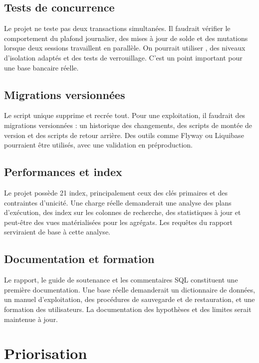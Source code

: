 \subsection{Tests de concurrence}

Le projet ne teste pas deux transactions simultanées. Il faudrait vérifier le
comportement du plafond journalier, des mises à jour de solde et des mutations
lorsque deux sessions travaillent en parallèle. On pourrait utiliser
, des niveaux d'isolation adaptés et des tests de verrouillage.
C'est un point important pour une base bancaire réelle.

\subsection{Migrations versionnées}

Le script unique supprime et recrée tout. Pour une exploitation, il faudrait
des migrations versionnées : un historique des changements, des scripts de
montée de version et des scripts de retour arrière. Des outils comme Flyway ou
Liquibase pourraient être utilisés, avec une validation en préproduction.

\subsection{Performances et index}

Le projet possède 21 index, principalement ceux des clés primaires et des
contraintes d'unicité. Une charge réelle demanderait une analyse des plans
d'exécution, des index sur les colonnes de recherche, des statistiques à jour
et peut-être des vues matérialisées pour les agrégats. Les requêtes du rapport
serviraient de base à cette analyse.

\subsection{Documentation et formation}

Le rapport, le guide de soutenance et les commentaires SQL constituent une
première documentation. Une base réelle demanderait un dictionnaire de données,
un manuel d'exploitation, des procédures de sauvegarde et de restauration, et
une formation des utilisateurs. La documentation des hypothèses et des limites
serait maintenue à jour.

\section{Priorisation}

